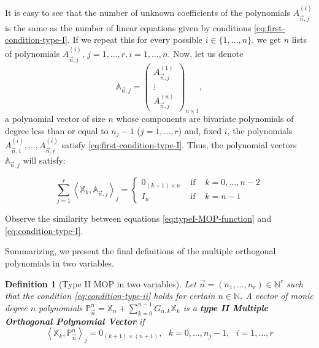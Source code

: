 \documentclass[12pt,a4]{article}
\theoremstyle{plain}
\newtheorem{definition}[theorem]{Definition}
\newcommand{\N}[0]{\mathbb{N}}
\newcommand{\prodesc}[2]{\left\langle #1 , #2 \right\rangle}
\begin{document}
It is easy to see that the number of unknown coefficients of the polynomials $A_{\vec n,j}^{(i)}$ is the same as the number of linear equations given by conditions \eqref{eq:first-condition-type-I}. If we repeat this for every possible $i\in\{1,\dots,n\}$, we get $n$ lists of polynomials $A_{\vec n, j}^{(i)}$, $j=1,\dots,r, i=1,\dots,n$. Now, let us denote
$$
\mathbb A_{\vec n,j} = \begin{pmatrix}
    A_{\vec n, j}^{(1)} \\ \vdots \\ A_{\vec n, j}^{(n)}
\end{pmatrix}_{n\times 1},
$$
a polynomial vector of size $n$ whose components are bivariate polynomials of degree less than or equal to $n_j-1$ ($j=1,\dots,r$) and, fixed $i$, the polynomials $A_{\vec n, 1}^{(i)},\dots,A_{\vec n, r}^{(i)}$ satisfy \eqref{eq:first-condition-type-I}. Thus, the polynomial vectors $\mathbb A_{\vec n,j}$ will satisfy:

\begin{equation}
    \label{eq:condition-type-I}
    \sum_{j=1}^r \prodesc{\mathbb X_k}{\mathbb A_{\vec n,j}}_j = \left\{\begin{array}{ccl}
        0_{(k+1)\times n} &   \text{ if } & k=0,\dots,n-2 \\
        I_n & \text{ if } & k=n-1      
    \end{array}\right.
\end{equation}

Observe the similarity between equations \eqref{eq:typeI-MOP-function} and \eqref{eq:condition-type-I}.
    
Summarizing, we present the final definitions of the multiple orthogonal polynomials in two variables.

\begin{definition}[Type II MOP in two variables]
    Let $\vec n = (n_1, \dots, n_r)\in \N^r$ such that the condition \eqref{eq:condition-type-ii} holds for certain $n\in\N$. A vector of monic degree $n$ polynomials $\mathbb P_{\vec n}^n = \mathbb X_n + \displaystyle\sum_{k=0}^{n-1} G_{n,k} \mathbb X_k$ is a \textbf{type II Multiple Orthogonal Polynomial Vector} if 
    \begin{equation}
        \label{eq:typeII-MOP-2vars}
        \prodesc{\mathbb X_k}{\mathbb P_{\vec n}^n}_j = 0_{(k+1)\times (n+1)}, \ \ \ k=0,\dots,n_j-1, \ \ \ i=1,\dots,r
    \end{equation}      
\end{definition}
\end{document}
